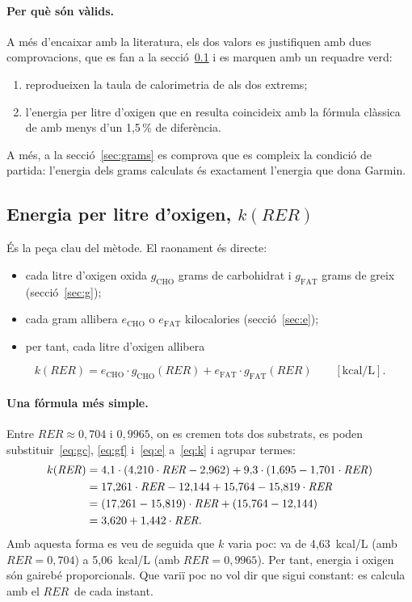 \documentclass[10pt,a4paper]{article}
\newcommand{\sub}[1]{{\scriptscriptstyle\mathrm{#1}}}   %
\newcommand{\CHO}{\sub{CHO}}
\newcommand{\FAT}{\sub{FAT}}
\newcommand{\RER}{\ensuremath{\mathit{RER}}}
\newcommand{\kcal}{\ensuremath{\mathrm{kcal}}}
\begin{document}
\paragraph{Per què són vàlids.} A més d'encaixar amb la literatura, els dos valors es
justifiquen amb dues comprovacions, que es fan a la secció~\ref{sec:k} i es marquen amb un
requadre verd:
\begin{enumerate}[label=(\alph*)]
  \item reprodueixen la taula de calorimetria de \citet{peronnet1991} als dos extrems;
  \item l'energia per litre d'oxigen que en resulta coincideix amb la fórmula clàssica de
        \citet{weir1949} amb menys d'un 1,5\,\% de diferència.
\end{enumerate}
A més, a la secció~\ref{sec:grams} es comprova que es compleix la condició de partida:
l'energia dels grams calculats és exactament l'energia que dona Garmin.

\subsection{Energia per litre d'oxigen, \texorpdfstring{$k(\mathit{RER})$}{k(RER)}}\label{sec:k}
És la peça clau del mètode. El raonament és directe:
\begin{itemize}
  \item cada litre d'oxigen oxida $g_{\CHO}$ grams de carbohidrat i $g_{\FAT}$ grams de
        greix (secció~\ref{sec:g});
  \item cada gram allibera $e_{\CHO}$ o $e_{\FAT}$ kilocalories (secció~\ref{sec:e});
  \item per tant, cada litre d'oxigen allibera
\end{itemize}
\begin{equation}
  k(\RER)=e_{\CHO}\cdot g_{\CHO}(\RER)+e_{\FAT}\cdot g_{\FAT}(\RER)\qquad[\kcal/\mathrm{L}].
  \label{eq:k}
\end{equation}

\paragraph{Una fórmula més simple.} Entre $\RER\approx0{,}704$ i $0{,}9965$, on es cremen
tots dos substrats, es poden substituir~\eqref{eq:gc}, \eqref{eq:gf} i~\eqref{eq:e}
a~\eqref{eq:k} i agrupar termes:
\begin{align}
  k(\RER) &= 4{,}1\cdot(4{,}210\cdot\RER-2{,}962)+9{,}3\cdot(1{,}695-1{,}701\cdot\RER) \notag\\
          &= 17{,}261\cdot\RER-12{,}144+15{,}764-15{,}819\cdot\RER \notag\\
          &= (17{,}261-15{,}819)\cdot\RER+(15{,}764-12{,}144) \notag\\
          &= 3{,}620+1{,}442\cdot\RER . \label{eq:klin}
\end{align}
Amb aquesta forma es veu de seguida que $k$ varia poc: va de 4,63~kcal/L (amb
$\RER=0{,}704$) a 5,06~kcal/L (amb $\RER=0{,}9965$). Per tant, energia i oxigen són gairebé
proporcionals. Que variï poc no vol dir que sigui constant: es calcula amb el \RER\ de
cada instant.
\end{document}
